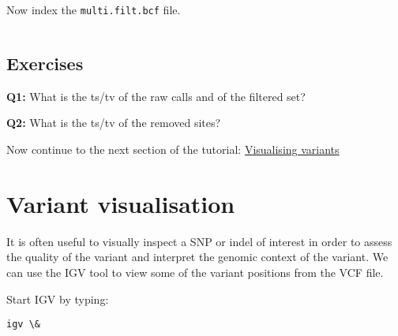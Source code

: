 \documentclass[11pt]{article}
\makeatletter
\newcommand{\boxspacing}{\kern\kvtcb@left@rule\kern\kvtcb@boxsep}
\newcommand{\prompt}[4]{

        {\ttfamily\llap{{\color{blue}\LARGE\faKeyboardO\hspace{3pt}#4}}\vspace{-\baselineskip}}
    }
\makeatother
\begin{document}
    Now index the \texttt{multi.filt.bcf} file.

    \begin{tcolorbox}[breakable, size=fbox, boxrule=1pt, pad at break*=1mm,colback=cellbackground, colframe=cellborder]
\prompt{In}{incolor}{ }{\boxspacing}
\begin{Verbatim}[commandchars=\\\{\}]

\end{Verbatim}
\end{tcolorbox}

    \hypertarget{exercises}{%
\subsection{Exercises}\label{exercises}}

    \textbf{Q1:} What is the ts/tv of the raw calls and of the filtered set?

    \textbf{Q2:} What is the ts/tv of the removed sites?

    Now continue to the next section of the tutorial:
\href{visualisation.ipynb}{Visualising variants}





\newpage





    \hypertarget{variant-visualisation}{%
\section{Variant visualisation}\label{variant-visualisation}}

It is often useful to visually inspect a SNP or indel of interest in
order to assess the quality of the variant and interpret the genomic
context of the variant. We can use the IGV tool to view some of the
variant positions from the VCF file.

Start IGV by typing:

    \begin{tcolorbox}[breakable, size=fbox, boxrule=1pt, pad at break*=1mm,colback=cellbackground, colframe=cellborder]
\prompt{In}{incolor}{ }{\boxspacing}
\begin{Verbatim}[commandchars=\\\{\}]
igv \&
\end{Verbatim}
\end{tcolorbox}
\end{document}
